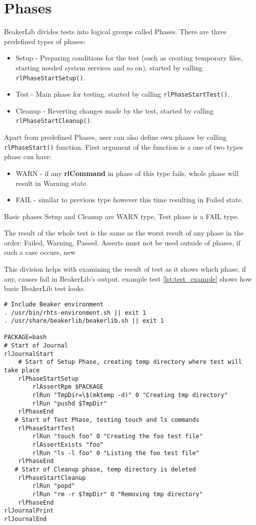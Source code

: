 \section{Phases}
BeakerLib divides tests into logical groups called Phases. There are three predefined types of phases:
\begin{itemize}
\item Setup - Preparing conditions for the test (such as creating temporary files, starting needed system services and so on), started by calling \texttt{rlPhaseStartSetup()}.
\item Test - Main phase for testing, started by calling \texttt{rlPhaseStartTest()}.
\item Cleanup - Reverting changes made by the test, started by calling \mbox{\texttt{rlPhaseStartCleanup()}}.
\end{itemize}

Apart from predefined Phases, user can also define own phases by calling \texttt{rlPhaseStart()} function. First argument of the function is a one of two types phase can have:

\begin{itemize}
\item WARN - if any \textbf{rlCommand} in phase of this type fails, whole phase will result in Warning state.
\item FAIL - similar to previous type however this time resulting in Failed state.
\end{itemize}

Basic phases Setup and Cleanup are WARN type, Test phase is a FAIL type.

The result of the whole test is the same as the worst result of any phase in the order: Failed, Warning, Passed.
Asserts must not be used outside of phases, if such a case occurs, new  

This division helps with examining the result of test as it shows which phase, if any, causes fail in BeakerLib's output. 
example test \ref{lst:test_example} shows how basic BeakerLib test looks.
\\
\begin{lstlisting}[style=beakerlib_bash,caption={BeakerLib basic test example},label={lst:test_example}]
# Include Beaker environment
. /usr/bin/rhts-environment.sh || exit 1
. /usr/share/beakerlib/beakerlib.sh || exit 1

PACKAGE=bash
# Start of Journal
rlJournalStart
    # Start of Setup Phase, creating temp directory where test will take place 
    rlPhaseStartSetup
        rlAssertRpm $PACKAGE
        rlRun "TmpDir=\$(mktemp -d)" 0 "Creating tmp directory"
        rlRun "pushd $TmpDir"
    rlPhaseEnd
   # Start of Test Phase, testing touch and ls commands
    rlPhaseStartTest
        rlRun "touch foo" 0 "Creating the foo test file"
        rlAssertExists "foo"
        rlRun "ls -l foo" 0 "Listing the foo test file"
    rlPhaseEnd
   # Statr of Cleanup phase, temp directory is deleted
    rlPhaseStartCleanup
        rlRun "popd"
        rlRun "rm -r $TmpDir" 0 "Removing tmp directory"
    rlPhaseEnd
rlJournalPrint
rlJournalEnd
\end{lstlisting}

